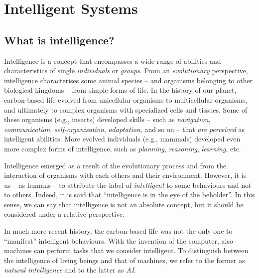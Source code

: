 
\chapter{Intelligent Systems}
\label{ch:intelligent-systems}
\mtcaddchapter
\minitoc

\section{What is intelligence?}\label{sec:what-is-intelligence}

Intelligence is a concept that encompasses a wide range of abilities and characteristics of single \emph{individuals} or \emph{groups}.
%
From an \emph{evolutionary} perspective, intelligence characterises some animal species -- and organisms belonging to other biological kingdoms -- from simple forms of life.
%
In the history of our planet, carbon-based life evolved from unicellular organisms to multicellular organisms, and ultimately to complex organisms with specialized cells and tissues.
%
Some of these organisms (e.g., insects) developed skills -- such as \emph{navigation}, \emph{communication}, \emph{self-organisation}, \emph{adaptation}, and so on -- that \emph{are perceived} as intelligent abilities.
%
More evolved individuals (e.g., mammals) developed even more complex forms of intelligence, such as \emph{planning}, \emph{reasoning}, \emph{learning}, etc.


Intelligence emerged as a result of the evolutionary process and from the interaction of organisms with each others and their environment.
%
However, it is us -- as humans -- to attribute the label of \emph{intelligent} to some behaviours and not to others.
%
Indeed, it is said that ``intelligence is in the eye of the beholder''.
%
In this sense, we can say that intelligence is not an absolute concept, but it should be considered under a relative perspective.


In much more recent history, the carbon-based life was not the only one to ``manifest'' intelligent behaviours.
%
With the invention of the computer, also machines can perform tasks that we consider intelligent.
%
To distinguish between the intelligence of living beings and that of machines, we refer to the former as \emph{natural intelligence} and to the latter as \emph{\gls{AI}}.


